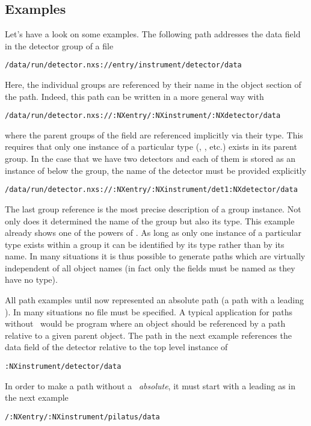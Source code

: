 \subsection{Examples}
Let's have a look on some examples. The following path addresses the data field 
in the detector group of a file
\begin{verbatim}
/data/run/detector.nxs://entry/instrument/detector/data
\end{verbatim}
Here, the individual groups are referenced by their name in the object section 
of the path. Indeed, this path can be written in a more general way with 
\begin{verbatim}
/data/run/detector.nxs://:NXentry/:NXinstrument/:NXdetector/data
\end{verbatim}
where the parent groups of the  field are referenced implicitly via
their type.  This requires that only one instance of a particular type
(, , etc.)  exists in its parent group. In the
case that we have two detectors and each of them is stored as an instance of
 below the  group, the name of the detector
must be provided explicitly 
\begin{verbatim}
/data/run/detector.nxs://:NXentry/:NXinstrument/det1:NXdetector/data
\end{verbatim}
The last group reference  is the most precise 
description of a group instance. Not only does it determined the name 
of the group but also its type.  This example already shows one of the 
powers of \nexus. As long as only one instance of a particular type exists
within a group it can be identified by its type rather than by its name. 
In many situations it is thus possible to generate paths which are virtually
independent of all object names (in fact only the fields must be named as they
have no type).

All path examples until now represented an absolute path (a path with a leading
\fsection). In many situations no file must be specified. A typical application
for paths without \fsection\ would be program where an object should be
referenced by a path relative to a given parent object. 
The path in the next example references the data field of the detector 
relative to the top level instance of 
\begin{verbatim}
:NXinstrument/detector/data 
\end{verbatim}
In order to make a path without a \fsection\ \emph{absolute}, it must 
start with a leading \cpp{/} as in the next example
\begin{verbatim}
/:NXentry/:NXinstrument/pilatus/data
\end{verbatim}

